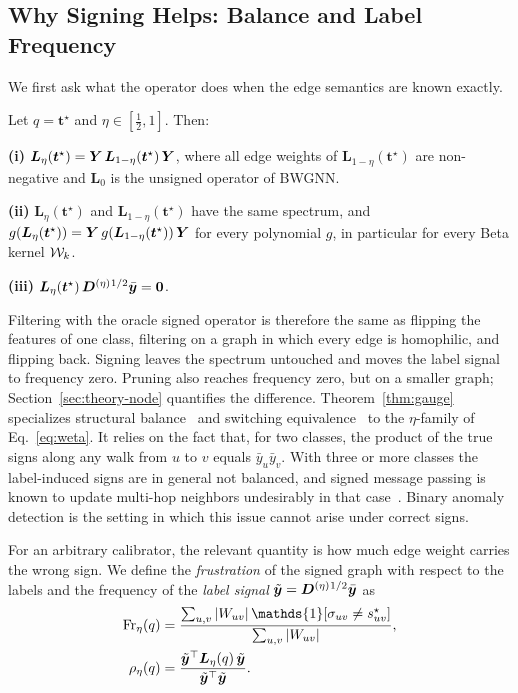 \subsection{Why Signing Helps: Balance and Label Frequency}\label{sec:theory-spectral}

We first ask what the operator does when the edge semantics are known exactly.

\begin{theorem}\label{thm:gauge}
Let $q=\bm t^\star$ and $\eta\in[\tfrac12,1]$. Then:

\smallskip\noindent\textbf{(i)} $\bm L_\eta(\bm t^\star)=\bm{Y}\,\bm L_{1-\eta}(\bm t^\star)\,\bm{Y}$, where all edge weights of $\bm L_{1-\eta}(\bm t^\star)$ are non-negative and $\bm L_{0}$ is the unsigned operator of BWGNN.

\smallskip\noindent\textbf{(ii)} $\bm L_\eta(\bm t^\star)$ and $\bm L_{1-\eta}(\bm t^\star)$ have the same spectrum, and $g(\bm L_\eta(\bm t^\star))=\bm{Y}\,g(\bm L_{1-\eta}(\bm t^\star))\,\bm{Y}$ for every polynomial $g$, in particular for every Beta kernel $\mathcal{W}_k$.

\smallskip\noindent\textbf{(iii)} $\bm L_\eta(\bm t^\star)\,\bm{D}^{(\eta)}{}^{1/2}\bar{\bm{y}}=\bm 0$.
\end{theorem}

Filtering with the oracle signed operator is therefore the same as flipping the features of one class, filtering on a graph in which every edge is homophilic, and flipping back.
Signing leaves the spectrum untouched and moves the label signal to frequency zero.
Pruning also reaches frequency zero, but on a smaller graph; Section~\ref{sec:theory-node} quantifies the difference.
Theorem~\ref{thm:gauge} specializes structural balance~\citep{Harary1953} and switching equivalence~\citep{Zaslavsky1982,KunegisSigned} to the $\eta$-family of Eq.~\eqref{eq:weta}.
It relies on the fact that, for two classes, the product of the true signs along any walk from $u$ to $v$ equals $\bar y_u\bar y_v$.
With three or more classes the label-induced signs are in general not balanced, and signed message passing is known to update multi-hop neighbors undesirably in that case~\citep{SignNotRemedy}.
Binary anomaly detection is the setting in which this issue cannot arise under correct signs.

For an arbitrary calibrator, the relevant quantity is how much edge weight carries the wrong sign.
We define the \emph{frustration} of the signed graph with respect to the labels and the frequency of the \emph{label signal} $\tilde{\bm{y}}=\bm{D}^{(\eta)}{}^{1/2}\bar{\bm{y}}$ as
\begin{align}
\Fr_\eta(q)&=\frac{\sum_{u,v}|W_{uv}|\,\mathds{1}[\sigma_{uv}\neq\sstar_{uv}]}{\sum_{u,v}|W_{uv}|},\label{eq:frustration}\\
\rho_\eta(q)&=\frac{\yt^{\top}\bm L_\eta(q)\,\yt}{\yt^{\top}\yt}.\label{eq:labelfreq}
\end{align}

